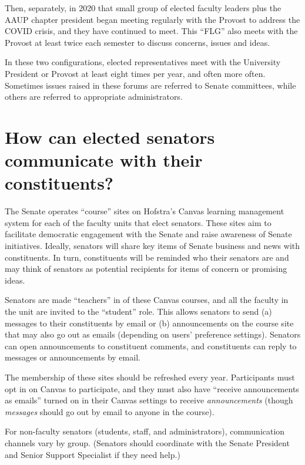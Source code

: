 \documentclass[12pt]{article}
\begin{document}
Then, separately, in 2020 that small group of elected faculty leaders
plus the AAUP chapter president began meeting regularly with the Provost
to address the COVID crisis, and they have continued to meet. This
``FLG'' also meets with the Provost at least twice each semester to
discuss concerns, issues and ideas.

In these two configurations, elected representatives meet with the
University President or Provost at least eight times per year, and often
more often. Sometimes issues raised in these forums are referred to
Senate committees, while others are referred to appropriate
administrators.

\section{How can elected senators communicate with their
constituents?}\label{how-can-elected-senators-communicate-with-their-constituents}

The Senate operates ``course'' sites on Hofstra's Canvas learning
management system for each of the faculty units that elect senators.
These sites aim to facilitate democratic engagement with the Senate and
raise awareness of Senate initiatives. Ideally, senators will share key
items of Senate business and news with constituents. In turn,
constituents will be reminded who their senators are and may think of
senators as potential recipients for items of concern or promising
ideas.

Senators are made ``teachers'' in of these Canvas courses, and all the
faculty in the unit are invited to the ``student'' role. This allows
senators to send (a) messages to their constituents by email or (b)
announcements on the course site that may also go out as emails
(depending on users' preference settings). Senators can open
announcements to constituent comments, and constituents can reply to
messages or announcements by email.

The membership of these sites should be refreshed every year.
Participants must opt in on Canvas to participate, and they must also
have ``receive announcements as emails'' turned on in their Canvas
settings to receive \emph{announcements} (though \emph{messages} should
go out by email to anyone in the course).

For non-faculty senators (students, staff, and administrators),
communication channels vary by group. (Senators should coordinate with
the Senate President and Senior Support Specialist if they need help.)
\end{document}
